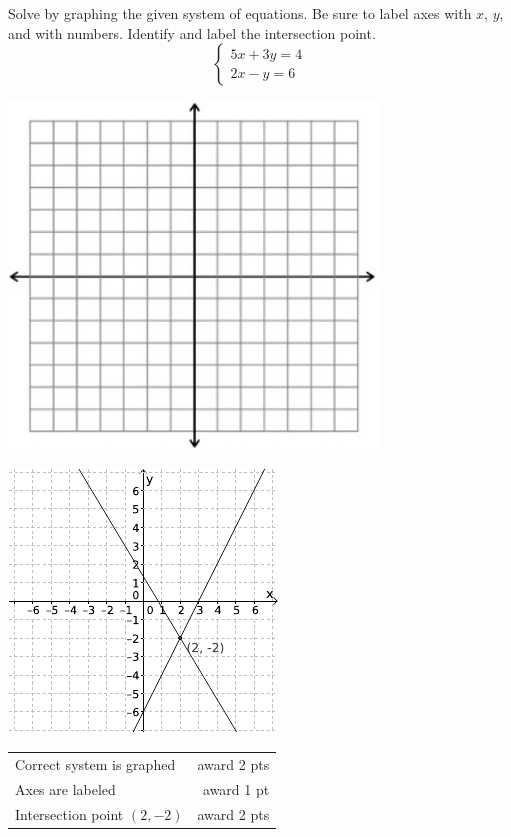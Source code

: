 {
	Solve by graphing the given system of equations. Be sure to label axes with $x$, $y$, and with numbers. Identify and label the intersection point. $$\begin{cases}5x+3y=4\\ 2x-y=6\end{cases}$$ \begin{onlyproblem}\begin{center}\includegraphics{fig-graphpaper.png}\end{center}\end{onlyproblem} \begin{onlysolution}\begin{center}\includegraphics{fig095-10-b-answer}\end{center}\end{onlysolution}
	
}
{
	\begin{tabular}{l r}
	Correct system is graphed & award 2 pts\\
	Axes are labeled & award 1 pt\\
	Intersection point $(2,-2)$ & award 2 pts
	\end{tabular}
}

